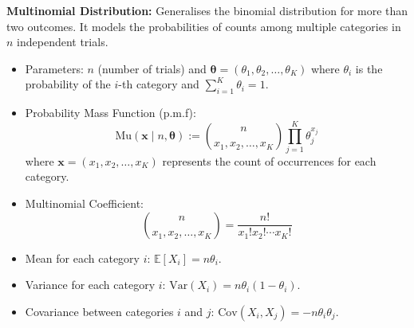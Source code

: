 \textbf{Multinomial Distribution:} Generalises the binomial distribution for more than two outcomes. It models the probabilities of counts among multiple categories in \(n\) independent trials.
\begin{itemize}
    \item Parameters: \(n\) (number of trials) and \(\boldsymbol{\theta} = (\theta_1, \theta_2, \ldots, \theta_K)\) where \(\theta_i\) is the probability of the \(i\)-th category and \(\sum_{i=1}^{K} \theta_i = 1\).
    \item Probability Mass Function (p.m.f):
    \[
    \text{Mu}(\mathbf{x} \mid n, \boldsymbol{\theta}) := \binom{n}{x_1, x_2, \ldots, x_K} \prod_{j=1}^{K} \theta_j^{x_j}
    \]
    where \(\mathbf{x} = (x_1, x_2, \ldots, x_K)\) represents the count of occurrences for each category.
    \item Multinomial Coefficient:
    \[
    \binom{n}{x_1, x_2, \ldots, x_K} = \frac{n!}{x_1! x_2! \cdots x_K!}
    \]
    \item Mean for each category \(i\): \(\mathbb{E}[X_i] = n\theta_i\).
    \item Variance for each category \(i\): \(\text{Var}(X_i) = n\theta_i(1 - \theta_i)\).
    \item Covariance between categories \(i\) and \(j\): \(\text{Cov}(X_i, X_j) = -n\theta_i\theta_j\).
\end{itemize}


